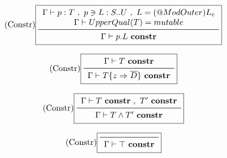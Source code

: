 \vspace{0.4cm}

\begin{equation*}\tag{Constr}\label{equ-constr}
\boxed{
\begin{array}{c}
\Gamma \vdash p: T\ ,\ p \ni L:S..U\ ,\ L = (@ModOuter) L_c \\
\Gamma \vdash UpperQual(T) = mutable \\
\midrule
\Gamma \vdash p.L\ {\bf constr} \\
\end{array}
}
\end{equation*}

\vspace{0.4cm}

\begin{equation*}\tag{Constr}\label{equ-}
\boxed{
\begin{array}{c}
\Gamma \vdash T\ {\bf constr} \\
\midrule
\Gamma \vdash T \{ z \Rightarrow \overline{D}\}\ {\bf constr} \\
\end{array}
}
\end{equation*}

\vspace{0.4cm}

\begin{equation*}\tag{Constr}\label{equ-}
\boxed{
\begin{array}{c}
\Gamma \vdash T\ {\bf constr}\ ,\ T'\ {\bf constr} \\
\midrule
\Gamma \vdash T \land T'\ {\bf constr} \\
\end{array}
}
\end{equation*}

\vspace{0.4cm}

\begin{equation*}\tag{Constr}\label{equ-}
\boxed{
\begin{array}{c}
\midrule
\Gamma \vdash \top\ {\bf constr} \\
\end{array}
}
\end{equation*}

\vspace{0.4cm}






